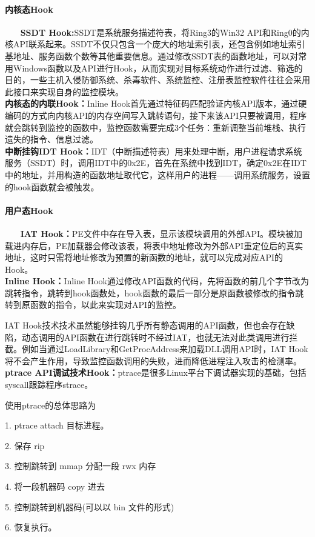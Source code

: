 \documentclass[12pt,a4paper]{ctexart}
\begin{document}
\paragraph{内核态Hook}
~~~\newline
\textbf{SSDT Hook:}SSDT是系统服务描述符表，将Ring3的Win32 API和Ring0的内核API联系起来。SSDT不仅只包含一个庞大的地址索引表，还包含例如地址索引基地址、服务函数个数等其他重要信息。通过修改SSDT表的函数地址，可以对常用Windows函数以及API进行Hook，从而实现对目标系统动作进行过滤、筛选的目的，一些主机入侵防御系统、杀毒软件、系统监控、注册表监控软件往往会采用此接口来实现自身的监控模块。\\
\textbf{内核态的内联Hook：}Inline Hook首先通过特征码匹配验证内核API版本，通过硬编码的方式向内核API的内存空间写入跳转语句，接下来该API只要被调用，程序就会跳转到监控的函数中，监控函数需要完成3个任务：重新调整当前堆栈、执行遗失的指令、信息过滤。\\
\textbf{中断挂钩IDT Hook：}IDT（中断描述符表）用来处理中断，用户进程请求系统服务（SSDT）时，调用IDT中的0x2E，首先在系统中找到IDT，确定0x2E在IDT中的地址，并用构造的函数地址取代它，这样用户的进程——调用系统服务，设置的hook函数就会被触发。

\paragraph{用户态Hook}
~~~\newline
\textbf{IAT Hook：}PE文件中存在导入表，显示该模块调用的外部API。模块被加载进内存后，PE加载器会修改该表，将表中地址修改为外部API重定位后的真实地址，这时只需将地址修改为预置的新函数的地址，就可以完成对应API的Hook。\\
\textbf{Inline Hook：}Inline Hook通过修改API函数的代码，先将函数的前几个字节改为跳转指令，跳转到hook函数处，hook函数的最后一部分是原函数被修改的指令跳转到原函数的指令，以此来实现对API的监控。


IAT Hook技术技术虽然能够挂钩几乎所有静态调用的API函数，但也会存在缺陷，动态调用的API函数在进行跳转时不经过IAT，也就无法对此类调用进行拦截。例如当通过LoadLibrary和GetProcAddress来加载DLL调用API时，IAT Hook将不会产生作用，导致监控函数调用的失败，进而降低进程注入攻击的检测率。\\
\textbf{ptrace API调试技术Hook：}ptrace是很多Linux平台下调试器实现的基础，包括syscall跟踪程序strace。


使用ptrace的总体思路为\par
1. ptrace attach 目标进程。\par
2. 保存 rip\par
3. 控制跳转到 mmap 分配一段 rwx 内存\par
4. 将一段机器码 copy 进去\par
5. 控制跳转到机器码(可以以 bin 文件的形式)\par
6. 恢复执行。
\end{document}
